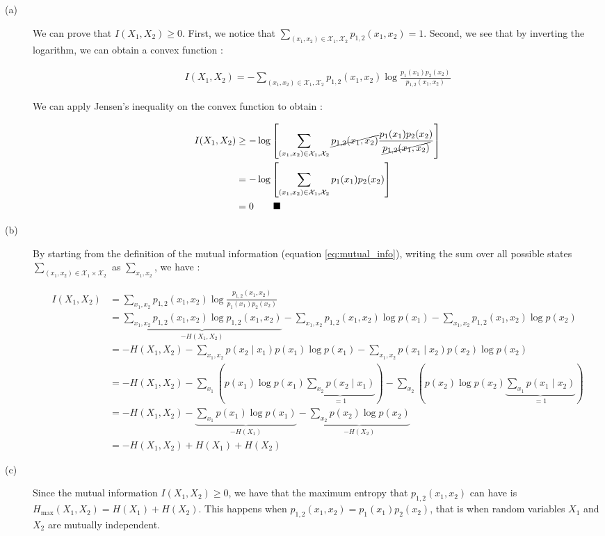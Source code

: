 \documentclass[11pt]{article}
\begin{document}
\begin{enumerate}
	\begin{description}
	
	\item[(a)] We can prove that $I(X_1,X_2) \geq 0$. First, we notice that $\sum_{(x_1,x_2)\in \mathcal{X}_1,\mathcal{X}_2} p_{1,2}(x_1,x_2) = 1$. Second, we see that by inverting the logarithm, we can obtain a convex function :
	
	\begin{align*}
		I(X_1,X_2) = - \sum_{(x_1,x_2)\in \mathcal{X}_1,\mathcal{X}_2} p_{1,2}(x_1,x_2) \log \frac{p_1(x_1)p_2(x_2)}{p_{1,2}(x_1,x_2)}
	\end{align*}
	
	We can apply Jensen's inequality on the convex function to obtain :
	
	\begin{align*}
	I(X_1,X_2) & \geq -\log \left[ \sum_{(x_1,x_2)\in \mathcal{X}_1,\mathcal{X}_2} \cancel{p_{1,2}(x_1,x_2)}\frac{p_1(x_1)p_2(x_2)}{\cancel{p_{1,2}(x_1,x_2)}} \right]\\
			   & = -\log \left[ \sum_{(x_1,x_2)\in \mathcal{X}_1,\mathcal{X}_2}p_1(x_1)p_2(x_2) \right] \\
			   & = 0\qquad \blacksquare
	\end{align*}
	
	\item[(b)] By starting from the definition of the mutual information (equation \ref{eq:mutual_info}), writing the sum over all possible states $\sum_{(x_1,x_2) \in \mathcal{X}_1 \times \mathcal{X}_2}$ as $\sum_{x_1, x_2}$, we have :
	
		\begin{align*}
		I(X_1, X_2) & = \sum_{x_1,x_2} p_{1,2}(x_1, x_2) \log \frac{p_{1,2}(x_1,x_2)}{p_1(x_1)p_2(x_2)} \\
					& = \underbrace{\sum_{x_1,x_2} p_{1,2}(x_1, x_2) \log p_{1,2} (x_1, x_2)}_{-H(X_1,X_2)} - \sum_{x_1,x_2} p_{1,2}(x_1,x_2) \log p(x_1) - \sum_{x_1,x_2} p_{1,2}(x_1,x_2) \log p(x_2) \\
					& = - H(X_1,X_2) - \sum_{x_1,x_2} p(x_2\mid x_1) p(x_1) \log p(x_1) - \sum_{x_1,x_2} p(x_1\mid x_2) p(x_2) \log p(x_2) \\
					& = - H(X_1,X_2) - \sum_{x_1} \left( p(x_1)\log p(x_1) \underbrace{\sum_{x_2} p(x_2\mid x_1)}_{=1}\right) - \sum_{x_2} \left( p(x_2)\log p(x_2) \underbrace{\sum_{x_1} p(x_1\mid x_2)}_{=1} \right) \\
					& = -H(X_1,X_2) - \underbrace{\sum_{x_1} p(x_1) \log p(x_1)}_{-H(X_1)} - \underbrace{\sum_{x_2} p(x_2) \log p(x_2)}_{-H(X_2)} \\
					& = -H(X_1,X_2) + H(X_1) + H(X_2)
		\end{align*}
	
	\item[(c)] Since the mutual information $I(X_1,X_2) \geq 0$, we have that the maximum entropy that $p_{1,2}(x_1,x_2)$ can have is $H_{\mathrm{max}}(X_1,X_2) = H(X_1) + H(X_2)$. This happens when $p_{1,2}(x_1,x_2) = p_1(x_1)p_2(x_2)$, that is when random variables $X_1$ and $X_2$ are mutually independent.
	
	\end{description}


\end{enumerate}
\end{document}

